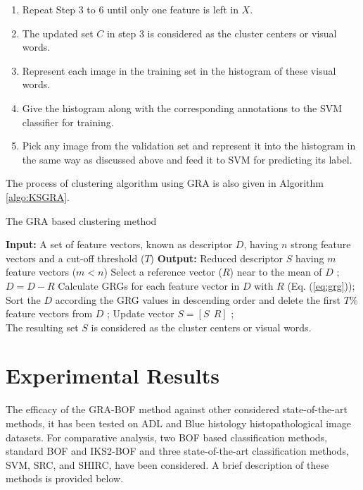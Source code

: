 \begin{enumerate}
\item Repeat Step 3 to 6 until only one feature is left in $X$.

\item The updated set $C$ in step 3 is considered as the cluster centers or visual words.

\item Represent each image in the training set in the histogram of these visual words.

\item Give the histogram along with the corresponding annotations to the SVM classifier for training.

\item Pick any image from the validation set and represent it into the histogram in the same way as discussed above and feed it to SVM for predicting its label.  

\end{enumerate}

The process of clustering algorithm using GRA is also given in Algorithm \ref{algo:KSGRA}. 

\begin{algorithm}
\caption{The GRA based clustering method}
\label{algo:KSGRA}
\footnotesize
\begin{algorithmic}
\STATE \textbf{Input:}  A set of feature vectors, known as descriptor $D$, having $n$  strong feature vectors and a cut-off threshold ($T$)  
\STATE \textbf{Output:}  Reduced descriptor $S$ having $m$ feature vectors ($m<n$)
     \STATE Select a reference vector ($R$) near to the mean of $D$ ;
     \STATE $D= D- R$
      \STATE Calculate GRGs for each feature vector in $D$ with $R$ (Eq. (\ref{eq:grg}));
    \STATE Sort the $D$ according the GRG values in descending order and delete the first $T\%$ feature vectors from $D$ ;
    \STATE Update vector $S=[S\ \ R]$ ;
\ENDWHILE \\
\STATE The resulting set $S$ is considered as the cluster centers or visual words.
\end{algorithmic}
\end{algorithm}

\section{Experimental Results} \label{Sec:exp}

The efficacy of the GRA-BOF method against other considered state-of-the-art methods, it has been tested on ADL and Blue histology histopathological image datasets. For comparative analysis, two BOF based classification methods, standard BOF and IKS2-BOF and three state-of-the-art classification methods, SVM, SRC, and SHIRC, have been considered. A brief description of these methods is provided below.

